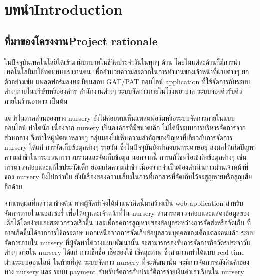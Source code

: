 \chapter{\ifcpe บทนำ\else Introduction\fi}

\section{\ifcpe ที่มาของโครงงาน\else Project rationale\fi}

ในปัจจุบันเทคโนโลยีได้เข้ามามีบทบาทในชีวิตประจําวันในทุกๆ ด้าน โดยในแต่ละด้านก็มีการนําเทคโนโลยีมาใช้ทดแทนแรงงานคน  เพื่ออํานวยความสะดวกในการทํางานของเจ้าหน้าที่ฝ่ายต่างๆ  ยกตัวอย่างเช่น แพลตฟอร์มลงทะเบียนสอบ GAT/PAT ออนไลน์ application ที่ใช้จัดการกับระบบต่างๆภายในบริษัทหรือองค์กร สำนักงานต่างๆ ระบบจัดการภายในโรงพยาบาล ระบบจองคิวรับคิวภายในร้านอาหาร เป็นต้น

แต่ว่าในภาคส่วนของทาง nursery ยังไม่ค่อยพบเห็นแพลตฟอร์มหรือระบบจัดการภายในแบบออนไลน์เท่าใดนัก
เนื่องจาก nursery เป็นองค์กรที่มีขนาดเล็ก ไม่ได้มีระบบการบริหารจัดการจากส่วนกลาง จึงทำให้ผู้พัฒนาหลายๆ กลุ่มมองไม่เห็นความสำคัญของปัญหาที่เกี่ยวกับการจัดการ nursery ได้แก่ การจัดเก็บข้อมูลต่างๆ รายวัน ซึ่งในปัจจุบันยังทำลงบนกระดาษอยู่ ส่งผลให้เกิดปัญหาความล่าช้าในกระบวนการรวบรวมและจัดเก็บข้อมูล
นอกจากนี้ การแก้ไขหรือเข้าถึงข้อมูลต่างๆ เช่น การตรวจสอบและแก้ไขประวัติเด็ก ย่อมเกิดความล่าช้า เนื่องจากจำเป็นต้องดำเนินการผ่านเจ้าหน้าที่ของ nursery ยิ่งไปกว่านั้น ยังมีเรื่องของความเสี่ยงในการที่เอกสารที่จัดเก็บไว้จะสูญหายหรือสูญเสียอีกด้วย

จากเหตุผลที่กล่าวมาข้างต้น ทางผู้จัดทําจึงได้นำแนวคิดนี้มาสร้างเป็น web application 
สําหรับจัดการภายในเนอสเซอรี่ เพื่อให้ครูและเจ้าหน้าที่ใน nursery สามารถตรวจสอบและแสดงข้อมูลของเด็กได้โดยง่ายและสะดวกรวดเร็วขึ้น และเพื่อลดการสูญหายของข้อมูลระหว่างการจัดส่งหรือจัดเก็บ ที่อาจเกิดขึ้นได้จากการใช้กระดาษ
นอกเหนือจากการจัดเก็บข้อมูลส่วนบุคคลของเด็กแต่ละคนแล้ว ระบบจัดการภายใน nursery ที่ผู้จัดทำได้วางแผนพัฒนานั้น จะสามารถรองรับการจัดการกิจวัตรประจำวันต่างๆ ภายใน nursery ได้แก่ การเช็คชื่อ เช็คของใช้ เช็คสุขภาพ
ซึ่งสามารถทำได้แบบ real-time ผ่านระบบออนไลน์
ในท้ายที่สุด ระบบจัดการ nursery ที่จะพัฒนานั้น จะมีการจัดการคลังสินค้าของทาง nursery และ ระบบ payment สำหรับจัดการกับประวัติการจ่ายเงินค่าเล่าเรียนใน nursery



